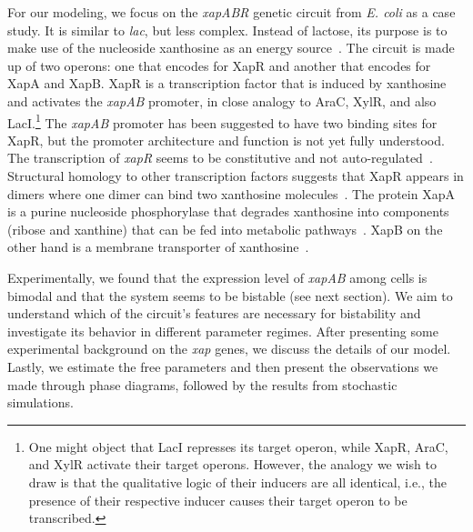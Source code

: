 \documentclass[10pt,letterpaper]{article}
\begin{document}
	For our modeling, we focus on the \emph{xapABR} genetic circuit from
	\emph{E. coli} as a case study. It is similar to \emph{lac}, but less
	complex. Instead of lactose, its purpose is to make use of the nucleoside
	xanthosine as an energy source~\cite{Buxton1980,Hammer-Jespersen1980}. The
	circuit is made up of two operons: one that encodes for XapR and another
	that encodes for XapA and XapB. XapR is a transcription factor
	that is induced by xanthosine and activates the \emph{xapAB} promoter,
	in close analogy to AraC, XylR, and also LacI.\footnote{One might object that LacI represses its target operon, while
	XapR, AraC, and XylR activate their target operons. However, the analogy
	we wish to draw is that the qualitative logic of their inducers are all
	identical, i.e., the presence of their respective inducer causes their
	target operon to be transcribed.} The \textit{xapAB} promoter has been suggested to have two binding sites for XapR\cite{Seeger1995},
	but the promoter architecture and function is not yet fully understood. The
	transcription of \emph{xapR} seems to be constitutive and not
	auto-regulated~\cite{Seeger1995}. Structural homology to other transcription
	factors suggests that XapR appears in dimers where one dimer can bind two
	xanthosine molecules~\cite{Joergensen1999}. The protein XapA is a purine
	nucleoside phosphorylase that degrades xanthosine into components (ribose
	and xanthine) that can be fed into metabolic
	pathways~\cite{Buxton1980,Hammer-Jespersen1980}. XapB on the other hand is a
	membrane transporter of xanthosine~\cite{Seeger1995,Norholm2001}.
	
	Experimentally, we found that the expression level of \emph{xapAB} among
	cells is bimodal and that the system seems to be
	bistable (see next section). We aim to understand which of the circuit's
	features are necessary for bistability and investigate its behavior in
	different parameter regimes. After presenting some experimental background on the \emph{xap} genes, we discuss the
	details of our model. Lastly, we estimate the free parameters and then present
	the observations we made through phase diagrams, followed by the results
	from stochastic simulations.
	
\end{document}

